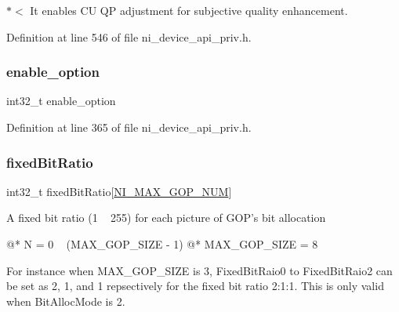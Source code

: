 $\ast$$<$ It enables CU QP adjustment for subjective quality enhancement. 

Definition at line 546 of file ni\+\_\+device\+\_\+api\+\_\+priv.\+h.

\mbox{\label{struct__ni__encoder__change__params__t_affb0a99e6c4d4898dd36042ed3f38f4a}} 
\subsubsection{\texorpdfstring{enable\_option}{enable\_option}}
{\footnotesize\ttfamily int32\+\_\+t enable\+\_\+option}



Definition at line 365 of file ni\+\_\+device\+\_\+api\+\_\+priv.\+h.

\mbox{\label{struct__ni__encoder__change__params__t_a353df24b5bd189d29cd18a776dbda11d}} 
\subsubsection{\texorpdfstring{fixedBitRatio}{fixedBitRatio}}
{\footnotesize\ttfamily int32\+\_\+t fixed\+Bit\+Ratio\mbox{[}\mbox{\hyperlink{ni__device__api_8h_a4fdb37034e4182c47a5c5e46a1385ff0}{N\+I\+\_\+\+M\+A\+X\+\_\+\+G\+O\+P\+\_\+\+N\+UM}}\mbox{]}}


\begin{DoxyItemize}
\item \begin{DoxyVerb}A fixed bit ratio (1 ~ 255) for each picture of GOP's bit
allocation

@* N = 0 ~ (MAX_GOP_SIZE - 1)
@* MAX_GOP_SIZE = 8

For instance when MAX_GOP_SIZE is 3, FixedBitRaio0
to FixedBitRaio2 can be set as 2, 1, and 1 repsectively for
the fixed bit ratio 2:1:1. This is only valid when BitAllocMode is 2.
\end{DoxyVerb}
 
\end{DoxyItemize}

